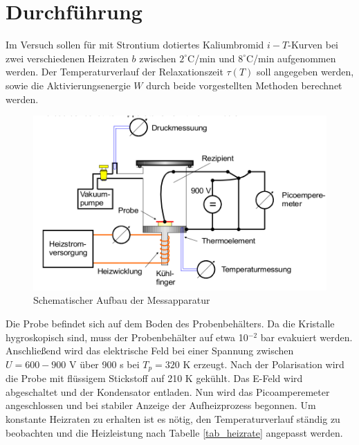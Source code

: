 \section{Durchführung}
Im Versuch sollen für mit Strontium dotiertes Kaliumbromid $i-T$-Kurven bei zwei verschiedenen Heizraten $b$ zwischen $2 ^\circ$C/min und $8 ^\circ$C/min
aufgenommen werden. Der Temperaturverlauf der Relaxationszeit $\tau(T)$ soll angegeben werden, sowie die Aktivierungsenergie $W$ durch beide vorgestellten
Methoden berechnet werden.
\begin{figure}[H]
\includegraphics[width=\textwidth]{../pics/dipolAufbau.png}
\caption{Schematischer Aufbau der Messapparatur}
\label{pic_dipolaufbau}
\end{figure}
Die Probe befindet sich auf dem Boden des Probenbehälters. Da die Kristalle hygroskopisch sind, muss der Probenbehälter auf etwa 10$^{-2}$ bar
evakuiert werden. Anschließend wird das elektrische Feld bei einer Spannung zwischen $U = 600-900$ V über 900 s bei $T_p=320$ K erzeugt. Nach der
Polarisation wird die Probe mit flüssigem Stickstoff auf 210 K gekühlt. Das E-Feld wird abgeschaltet und der Kondensator entladen. Nun wird das
Picoamperemeter angeschlossen und bei stabiler Anzeige der Aufheizprozess begonnen. Um konstante Heizraten zu erhalten ist es nötig, den Temperaturverlauf
ständig zu beobachten und die Heizleistung nach Tabelle \ref{tab_heizrate} angepasst werden.

